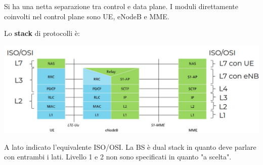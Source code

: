 Si ha una netta separazione tra control e data plane. I moduli direttamente coinvolti nel control plane sono UE, eNodeB e MME.

Lo \textbf{stack} di protocolli è:
\begin{center}
	\includegraphics[width=0.99\linewidth]{img/4g/cps}
\end{center}

A lato indicato l'equivalente ISO/OSI. La BS è dual stack in quanto deve parlare con entrambi i lati. Livello 1 e 2 non sono specificati in quanto "a scelta".

